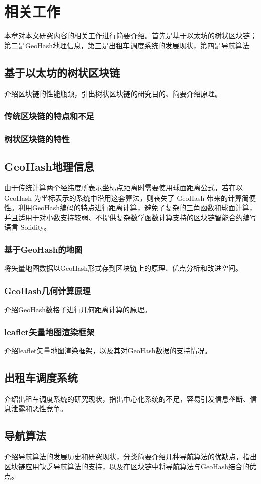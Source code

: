 \chapter{相关工作}
本章对本文研究内容的相关工作进行简要介绍。首先是基于以太坊的树状区块链；第二是GeoHash地理信息，第三是出租车调度系统的发展现状，第四是导航算法


\section{基于以太坊的树状区块链}
介绍区块链的性能瓶颈，引出树状区块链的研究目的、简要介绍原理。
\subsection{传统区块链的特点和不足}
\subsection{树状区块链的特性}

\section{GeoHash地理信息}
由于传统计算两个经纬度所表示坐标点距离时需要使用球面距离公式，若在以 GeoHash 为坐标表示的系统中沿用这套算法，则丧失了 GeoHash 带来的计算简便性。利用GeoHash编码的特点进行距离计算，避免了复杂的三角函数和球面计算，并且适用于对小数支持较弱、不提供复杂数学函数计算支持的区块链智能合约编写语言 Solidity。
\subsection{基于GeoHash的地图}
将矢量地图数据以GeoHash形式存到区块链上的原理、优点分析和改进空间。
\subsection{GeoHash几何计算原理}
介绍GeoHash数格子进行几何距离计算的原理。
\subsection{leaflet矢量地图渲染框架}
介绍leaflet矢量地图渲染框架，以及其对GeoHash数据的支持情况。

\section{出租车调度系统}
介绍出租车调度系统的研究现状，指出中心化系统的不足，容易引发信息垄断、信息泄露和恶性竞争。
\section{导航算法}
介绍导航算法的发展历史和研究现状，分类简要介绍几种导航算法的优缺点，指出区块链应用缺乏导航算法的支持，以及在区块链中将导航算法与GeoHash结合的优点。
